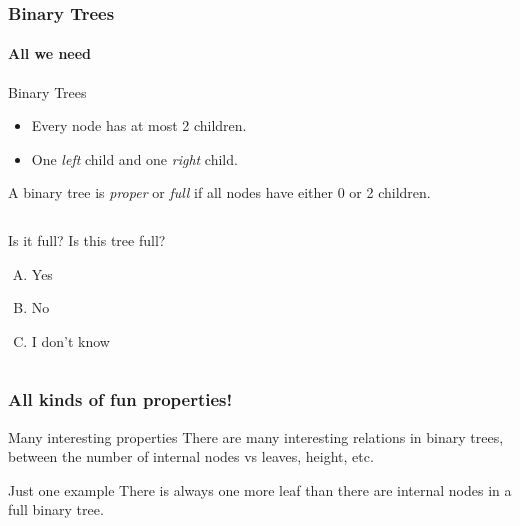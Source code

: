 \begin{frame}
	\frametitle{Binary Trees}
	\framesubtitle{All we need}

		\begin{block}{Binary Trees}
			\begin{itemize}
				\item Every node has at most 2 children.
					\pause
				\item One \textit{left} child and one \textit{right} child.
			\end{itemize}
		\pause
		A binary tree is \textit{proper} or \textit{full} if all nodes have either 0 or 2 children.
		\end{block}	

		\pause
		\begin{columns}
				
				
			\begin{questionblock}{Is it full?}
				Is this tree full?
				\begin{enumerate}[A.]
					\item Yes
					\item No
					\item I don't know
				\end{enumerate}
			\end{questionblock}
		\end{columns}
\end{frame}

\begin{frame}
	\frametitle{All kinds of fun properties!}
	
		\begin{block}{Many interesting properties}
			There are many interesting relations in binary trees, between the number of internal nodes vs leaves, height, etc.	
		\end{block}	
		\pause
		\begin{exampleblock}{Just one example}
			There is always one more leaf than there are internal nodes in a full binary tree.
		\end{exampleblock}	
\end{frame}
